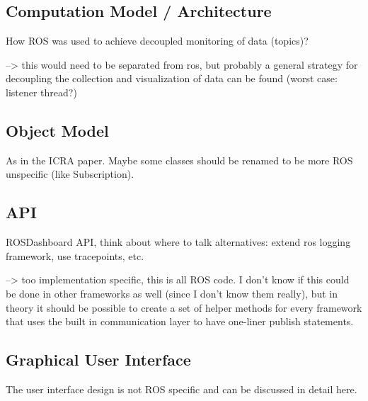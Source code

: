 \subsection{Computation Model / Architecture}
How ROS was used to achieve decoupled monitoring of data (topics)?

--> this would need to be separated from ros, but probably a general strategy for decoupling the collection and visualization of data can be found (worst case: listener thread?)

\subsection{Object Model}
As in the ICRA paper. Maybe some classes should be renamed to be more ROS unspecific (like Subscription).

\subsection{API}
ROSDashboard API, think about where to talk alternatives: extend ros logging framework, use tracepoints, etc.

--> too implementation specific, this is all ROS code. I don't know if this could be done in other frameworks as well (since I don't know them really), but in theory it should be possible to create a set of helper methods for every framework that uses the built in communication layer to have one-liner publish statements.
\subsection{Graphical User Interface}
The user interface design is not ROS specific and can be discussed in detail here.
